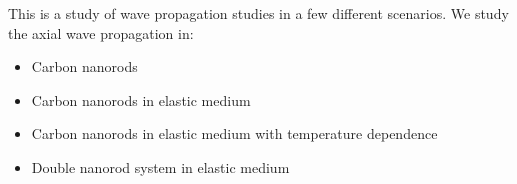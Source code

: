 This is a study of wave propagation studies in a few different scenarios. We study the axial wave propagation in:\\
\begin{itemize}
\item Carbon nanorods
\item Carbon nanorods in elastic medium
\item Carbon nanorods in elastic medium with temperature dependence
\item Double nanorod system in elastic medium
\end {itemize}

